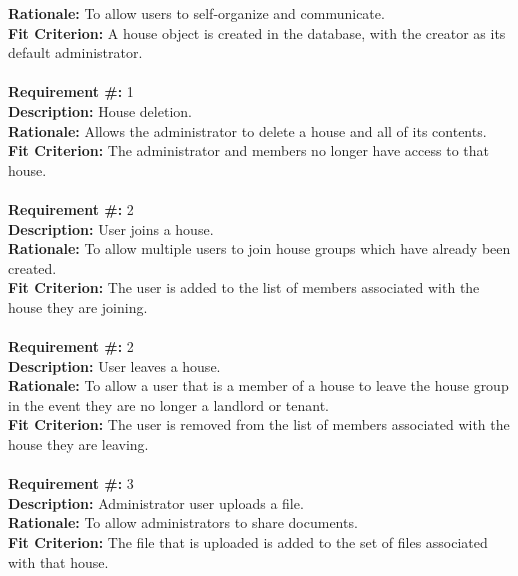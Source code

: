 \documentclass[12pt]{article}
\begin{document}
      \textbf{Rationale:} To allow users to self-organize and communicate. \\
      \textbf{Fit Criterion:} A house object is created in the database, with
      the creator as its default administrator. \\ \\  
\textbf{Requirement \#:} 1 
       \\
      \textbf{Description:} House deletion. \\
      \textbf{Rationale:} Allows the administrator to delete a house and all of its contents. \\
      \textbf{Fit Criterion:} The administrator and members no longer have access to that house. \\ \\  
\textbf{Requirement \#:} 2 
       \\
      \textbf{Description:} User joins a house. \\
      \textbf{Rationale:} To allow multiple users to join house groups which
      have already been created. \\
      \textbf{Fit Criterion:} The user is added to the list of members
      associated with the house they are joining. \\ \\
\textbf{Requirement \#:} 2 
       \\
      \textbf{Description:} User leaves a house. \\
      \textbf{Rationale:} To allow a user that is a member of a house to leave the house group in the event they are no longer a landlord or tenant. \\
      \textbf{Fit Criterion:} The user is removed from the list of members
      associated with the house they are leaving. \\ \\
\textbf{Requirement \#:} 3 
       \\
      \textbf{Description:} Administrator user uploads a file. \\
      \textbf{Rationale:} To allow administrators to share documents. \\
      \textbf{Fit Criterion:} The file that is uploaded is added to the set of
      files associated with that house. \\ \\
\end{document}
